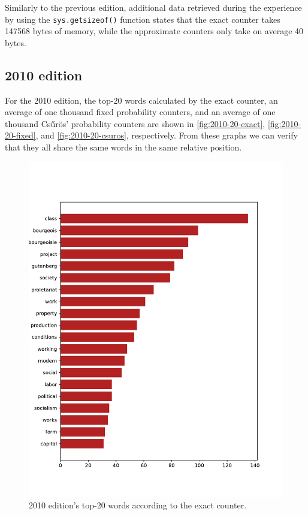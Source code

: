 Similarly to the previous edition, additional data retrieved during the experience by using the \verb|sys.getsizeof()| function states that the exact counter takes 147568 bytes of memory, while the approximate counters only take on average 40 bytes.

\newpage
\subsection{2010 edition}

For the 2010 edition, the top-20 words calculated by the exact counter, an average of one thousand fixed probability counters, and an average of one thousand Csűrös' probability counters are shown in \autoref{fig:2010-20-exact}, \autoref{fig:2010-20-fixed}, and \autoref{fig:2010-20-csuros}, respectively.
From these graphs we can verify that they all share the same words in the same relative position.

\begin{figure}[!ht]
    \centering
    \includegraphics[width=0.9\linewidth]{figs/2010.epub-total}
    \caption{2010 edition's top-20 words according to the exact counter.}
    \label{fig:2010-20-exact}
\end{figure}


